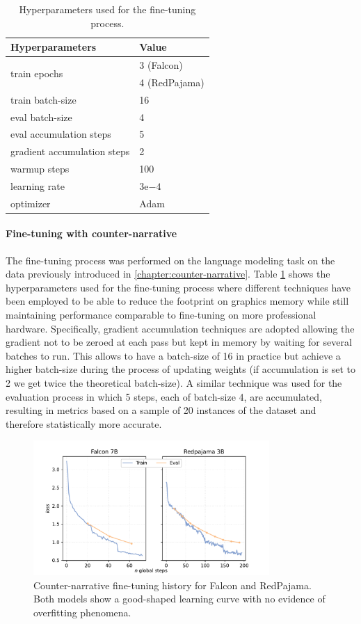 \begin{table}
\centering
\begin{tabular}{ll}
\toprule
\textbf{Hyperparameters} & \textbf{Value} \\ 
\midrule
\multirow{2}{*}{train epochs} & 3 (Falcon) \\
 & 4 (RedPajama) \\
train batch-size & 16 \\
eval batch-size & 4 \\ 
eval accumulation steps & 5 \\ 
gradient accumulation steps & 2 \\ 
warmup steps & 100 \\ 
learning rate & $3\mathrm{e}{-4}$ \\ 
optimizer & Adam \citep{Kingma2014AdamAM} \\ 
\bottomrule
\end{tabular}
\caption{Hyperparameters used for the fine-tuning process.}
\label{tab:FT-params}
\end{table}


\paragraph{Fine-tuning with counter-narrative} The fine-tuning process was performed on the language modeling task on the data previously introduced in \ref{chapter:counter-narrative}. Table \ref{tab:FT-params} shows the hyperparameters used for the fine-tuning process where different techniques have been employed to be able to reduce the footprint on graphics memory while still maintaining performance comparable to fine-tuning on more professional hardware. Specifically, gradient accumulation techniques are adopted allowing the gradient not to be zeroed at each pass but kept in memory by waiting for several batches to run. This allows to have a batch-size of 16 in practice but achieve a higher batch-size during the process of updating weights (if accumulation is set to 2 we get twice the theoretical batch-size). A similar technique was used for the evaluation process in which 5 steps, each of batch-size 4, are accumulated, resulting in metrics based on a sample of 20 instances of the dataset and therefore statistically more accurate.

\begin{figure}[h]
    \centering
    \includegraphics[width=0.8\textwidth]{Figs/FT-loss.pdf}
    \caption{Counter-narrative fine-tuning history for Falcon and RedPajama. Both models show a good-shaped learning curve with no evidence of overfitting phenomena.}
    \label{fig:FT-loss}
\end{figure}

